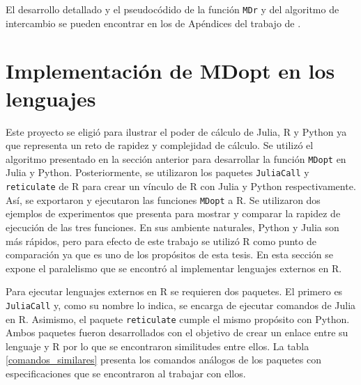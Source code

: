 El desarrollo detallado y el pseudocódido de la función \texttt{MDr} y del algoritmo de intercambio se pueden encontrar en los de Apéndices del trabajo de \cite{tesis_paty}.  

\section{Implementación de MDopt en los lenguajes}

Este proyecto se eligió para ilustrar el poder de cálculo de \textsf{Julia, R} y \textsf{Python} ya que representa un reto de rapidez y complejidad de cálculo. Se utilizó el algoritmo presentado en la sección anterior para desarrollar la función \texttt{MDopt} en \textsf{Julia} y \textsf{Python}. Posteriormente, se utilizaron los paquetes \texttt{JuliaCall} \citep{JuliaCall} y \texttt{reticulate} \citep{software_reticulate} de \textsf{R} para crear un vínculo de \textsf{R} con \textsf{Julia} y \textsf{Python} respectivamente. Así, se exportaron y ejecutaron las funciones \texttt{MDopt} a \textsf{R}. Se utilizaron dos ejemplos de experimentos que presenta \cite{meyer1996} para mostrar y comparar la rapidez de ejecución de las tres funciones. En sus ambiente naturales, \textsf{Python} y \textsf{Julia} son más rápidos, pero para efecto de este trabajo se utilizó \textsf{R} como punto de comparación ya que es uno de los propósitos de esta tesis. En esta sección se expone el paralelismo que se encontró al implementar lenguajes externos en \textsf{R}.

Para ejecutar lenguajes externos en \textsf{R} se requieren dos paquetes. El primero es \texttt{JuliaCall} y, como su nombre lo indica, se encarga de ejecutar comandos de \textsf{Julia} en \textsf{R}. Asimismo, el paquete \texttt{reticulate} cumple el mismo propósito con \textsf{Python}. Ambos paquetes fueron desarrollados con el objetivo de crear un enlace entre su lenguaje y \textsf{R} por lo que se encontraron similitudes entre ellos. La tabla \ref{comandos_similares} presenta los comandos análogos de los paquetes con especificaciones que se encontraron al trabajar con ellos. 

